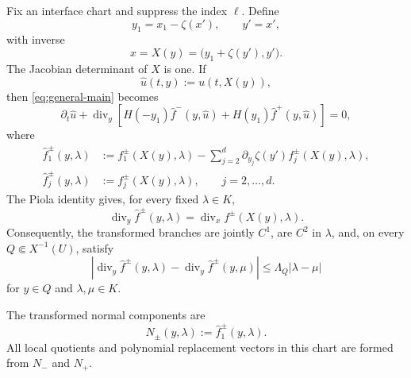 \documentclass[11pt]{amsart}
\numberwithin{equation}{section}
\theoremstyle{plain}
\theoremstyle{definition}
\theoremstyle{remark}
\begin{document}
Fix an interface chart and suppress the index \(\ell\). Define
\begin{equation}
\label{eq:general-flattening-map}
    y_1=x_1-\zeta(x'),
    \qquad
    y'=x',
\end{equation}
with inverse
\[
    x=X(y)
    =
    \bigl(y_1+\zeta(y'),y'\bigr).
\]
The Jacobian determinant of \(X\) is one. If
\[
    \widehat u(t,y):=u(t,X(y)),
\]
then \eqref{eq:general-main} becomes
\begin{equation}
\label{eq:general-flattened-equation}
\partial_t\widehat u
+
\operatorname{div}_y
\left[
    H(-y_1)\widehat f^-(y,\widehat u)
    +
    H(y_1)\widehat f^+(y,\widehat u)
\right]
=0,
\end{equation}
where
\begin{equation}
\label{eq:general-transformed-flux}
\begin{aligned}
    \widehat f_1^\pm(y,\lambda)
    &:=
    f_1^\pm(X(y),\lambda)
    -
    \sum_{j=2}^d
        \partial_{y_j}\zeta(y')
        f_j^\pm(X(y),\lambda),
\\
    \widehat f_j^\pm(y,\lambda)
    &:=
    f_j^\pm(X(y),\lambda),
    \qquad j=2,\ldots,d.
\end{aligned}
\end{equation}
The Piola identity gives, for every fixed \(\lambda\in K\),
\begin{equation}
\label{eq:general-piola-identity}
    \operatorname{div}_y\widehat f^\pm(y,\lambda)
    =
    \operatorname{div}_x f^\pm(X(y),\lambda).
\end{equation}
Consequently, the transformed branches are jointly \(C^1\), are \(C^2\) in
\(\lambda\), and, on every \(Q\Subset X^{-1}(U)\), satisfy
\begin{equation}
\label{eq:general-divergence-lipschitz}
\left|
    \operatorname{div}_y\widehat f^\pm(y,\lambda)
    -
    \operatorname{div}_y\widehat f^\pm(y,\mu)
\right|
\le
\Lambda_Q|\lambda-\mu|
\end{equation}
for \(y\in Q\) and \(\lambda,\mu\in K\).

The transformed normal components are
\begin{equation}
\label{eq:general-chart-normal-fluxes}
    N_\pm(y,\lambda)
    :=
    \widehat f_1^\pm(y,\lambda).
\end{equation}
All local quotients and polynomial replacement vectors in this chart are
formed from \(N_-\) and \(N_+\).
\end{document}
